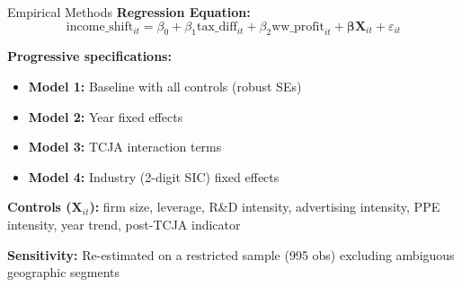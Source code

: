 \documentclass{beamer}
\begin{document}
\begin{frame}{Empirical Methods}
\textbf{Regression Equation:}
\begin{equation*}
\text{income\_shift}_{it} = \beta_0 + \beta_1 \text{tax\_diff}_{it} + \beta_2 \text{ww\_profit}_{it} + \boldsymbol{\beta} \mathbf{X}_{it} + \varepsilon_{it}
\end{equation*}

\vspace{0.1cm}
\textbf{Progressive specifications:}
\begin{itemize}
    \item \textbf{Model 1:} Baseline with all controls (robust SEs)
    \item \textbf{Model 2:} Year fixed effects
    \item \textbf{Model 3:} TCJA interaction terms
    \item \textbf{Model 4:} Industry (2-digit SIC) fixed effects
\end{itemize}

\vspace{0.2cm}
\textbf{Controls ($\mathbf{X}_{it}$):} firm size, leverage, R\&D intensity, advertising intensity, PPE intensity, year trend, post-TCJA indicator

\vspace{0.2cm}
\textbf{Sensitivity:} Re-estimated on a restricted sample (995 obs) excluding ambiguous geographic segments
\end{frame}
\end{document}
